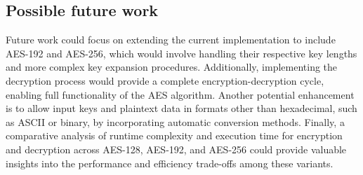 \subsection{Possible future work}

Future work could focus on extending the current implementation to include AES-192 and AES-256, which would involve handling their respective key lengths and more complex key expansion procedures. 
Additionally, implementing the decryption process would provide a complete encryption-decryption cycle, enabling full functionality of the AES algorithm. 
Another potential enhancement is to allow input keys and plaintext data in formats other than hexadecimal, such as ASCII or binary, by incorporating automatic conversion methods. 
Finally, a comparative analysis of runtime complexity and execution time for encryption and decryption across AES-128, AES-192, and AES-256 could provide valuable insights into the performance and efficiency trade-offs among these variants.